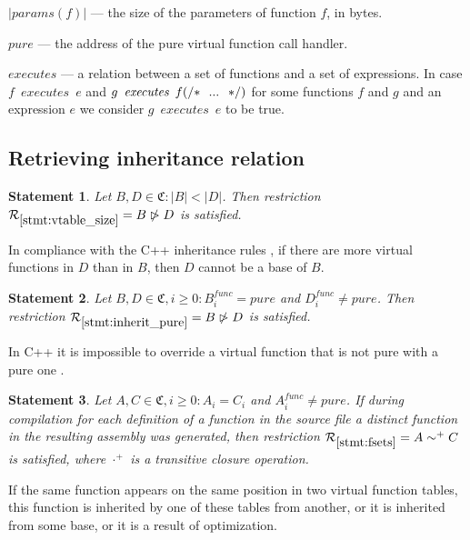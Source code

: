 \documentclass[times, 10pt,twocolumn]{article}
\newcommand{\gC}{\mathfrak{C}}
\newcommand{\cR}{\mathcal{R}}
\newcommand{\executes}{\textit{executes}}
\newcommand{\pure}{\textit{pure}}
\newcommand{\params}{\textit{params}}
\newcommand{\func}{\textit{func}}
\newcommand{\nrhd}{\ntriangleright}
\newtheorem{statement}{Statement}
\begin{document}
$|\params(f)|$ --- the size of the parameters of function $f$, in bytes.

$\pure$ --- the address of the pure virtual function call handler.

$\executes$ --- a relation between a set of functions and a set of expressions.
In case $f \enspace \executes \enspace e$ and
$g \enspace \executes \enspace f\text{\lstinline{(/* ... */)}}$
for some functions $f$ and $g$ and an expression $e$
we consider $g \enspace \executes \enspace e$ to be true.

\subsection{Retrieving inheritance relation}\label{ch:retrieving}

\begin{statement}\label{stmt:first_good}\label{stmt:vtable_size}
Let $B, D \in \gC: |B| < |D|$.
Then restriction $\cR_{\ref{stmt:vtable_size}} = B \nrhd D$ is satisfied.
\end{statement}
In compliance with the C++ inheritance rules \cite{cpp03},
if there are more virtual functions in $D$ than in $B$,
then $D$ cannot be a base of $B$.

\begin{statement}\label{stmt:inherit_pure}
Let $B, D \in \gC, i \ge 0: B_i^{\func} = \pure$ and $D_i^{\func} \ne \pure$.
Then restriction $\cR_{\ref{stmt:inherit_pure}} = B \nrhd D$ is satisfied.
\end{statement}
In C++ it is impossible to override a virtual function that is not pure
with a pure one \cite{cpp03}.

\begin{statement}\label{stmt:fsets}
Let $A, C \in \gC, i \ge 0: A_i = C_i$ and $A_i^{\func} \ne \pure$.
If during compilation for each definition of a function in the source file
a distinct function in the resulting assembly was generated,
then restriction $\cR_{\ref{stmt:fsets}} = A \sim^+ C$ is satisfied,
where $\cdot^+$ is a transitive closure operation.
\end{statement}
If the same function appears on the same position in
two virtual function tables, this function is inherited by one of these tables
from another, or it is inherited from some base,
or it is a result of optimization.
\end{document}
